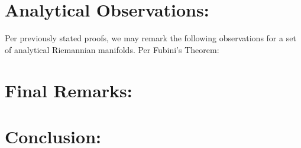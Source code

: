 \documentclass[10pt]{article}
\theoremstyle{plain}
\theoremstyle{definition}
\theoremstyle{remark}
\begin{document}
\section{Analytical Observations:}

Per previously stated proofs, we may remark the following observations for a set of analytical Riemannian manifolds. Per Fubini's Theorem:

\section{Final Remarks:}

\section{Conclusion:}

\nocite{*}



\end{document}
